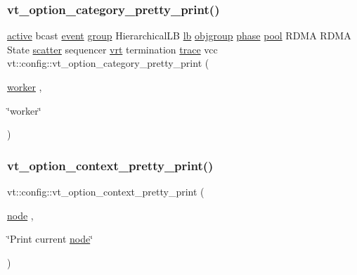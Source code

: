 \subsubsection{\texorpdfstring{vt\+\_\+option\+\_\+category\+\_\+pretty\+\_\+print()}{vt\_option\_category\_pretty\_print()}\hspace{0.1cm}{\footnotesize\ttfamily [17/17]}}
{\footnotesize\ttfamily \hyperlink{namespacevt_1_1config_a6bd1d6215bda0d8ca02811798399f689a82f77c67af0c363709010c6df4dbd920}{active} bcast \hyperlink{namespacevt_1_1config_a6bd1d6215bda0d8ca02811798399f689a9e0b3f734ed730f6f3117f0687eda7df}{event} \hyperlink{namespacevt_1_1config_a6bd1d6215bda0d8ca02811798399f689a132506d2b8e888d0a91ae4470d4197c1}{group} Hierarchical\+LB \hyperlink{namespacevt_1_1config_a6bd1d6215bda0d8ca02811798399f689aecb25779c74e06cc3e6baf03ed8289ed}{lb} \hyperlink{namespacevt_1_1config_a6bd1d6215bda0d8ca02811798399f689a338198b4d813c2e8d709e0015fc40d45}{objgroup} \hyperlink{namespacevt_1_1config_a6bd1d6215bda0d8ca02811798399f689ab2d71eabd52b3ba898df5e1ee6a20089}{phase} \hyperlink{namespacevt_1_1config_a6bd1d6215bda0d8ca02811798399f689a50ba0efa092380eb92cee1d921d6e40f}{pool} R\+D\+MA R\+D\+MA State \hyperlink{namespacevt_1_1config_a6bd1d6215bda0d8ca02811798399f689ab0821d060501c20d94b8d700df7fdd76}{scatter} sequencer \hyperlink{namespacevt_1_1config_a6bd1d6215bda0d8ca02811798399f689a012d139c89a14e56a85f32fd82e7c7d3}{vrt} termination \hyperlink{namespacevt_1_1config_a6bd1d6215bda0d8ca02811798399f689aa14cb3132cde2e74239755b4c3944f43}{trace} vcc vt\+::config\+::vt\+\_\+option\+\_\+category\+\_\+pretty\+\_\+print (\begin{DoxyParamCaption}\item[{\hyperlink{namespacevt_1_1config_a6bd1d6215bda0d8ca02811798399f689a24771d4179e70d6e207872dbca07e2ef}{worker}}]{,  }\item[{\char`\"{}worker\char`\"{}}]{ }\end{DoxyParamCaption})}

\mbox{\label{namespacevt_1_1config_a7318827247b6fe5313529e7c8b2a9a28}} 
\subsubsection{\texorpdfstring{vt\+\_\+option\+\_\+context\+\_\+pretty\+\_\+print()}{vt\_option\_context\_pretty\_print()}}
{\footnotesize\ttfamily vt\+::config\+::vt\+\_\+option\+\_\+context\+\_\+pretty\+\_\+print (\begin{DoxyParamCaption}\item[{\hyperlink{namespacevt_1_1config_a46e57c33bee1b9f1fa95455af86d80e0a576033c81e2ddd03d721ecef3b1b3f81}{node}}]{,  }\item[{\char`\"{}Print current \hyperlink{namespacevt_1_1config_a46e57c33bee1b9f1fa95455af86d80e0a576033c81e2ddd03d721ecef3b1b3f81}{node}\char`\"{}}]{ }\end{DoxyParamCaption})}

